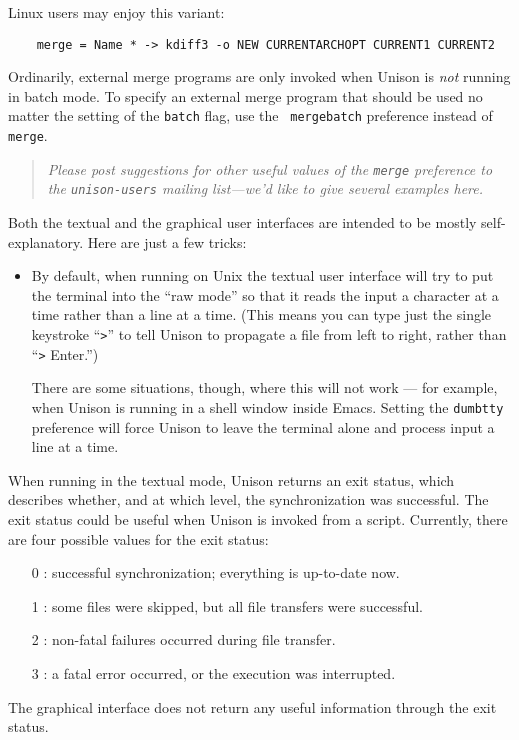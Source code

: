 \documentclass{article}
\begin{document}
Linux users may enjoy this variant:
\begin{verbatim}
    merge = Name * -> kdiff3 -o NEW CURRENTARCHOPT CURRENT1 CURRENT2
\end{verbatim}

Ordinarily, external merge programs are only invoked when Unison is {\em
  not} running in batch mode.  To specify an external merge program that
should be used no matter the setting of the {\tt batch} flag, use the {\tt
  mergebatch} preference instead of {\tt merge}.

\begin{quote}
\it
Please post suggestions for other useful values of the
\verb|merge| preference to the {\tt unison-users} mailing list---we'd like
to give several examples here.
\end{quote}



Both the textual and the graphical user interfaces are intended to be
mostly self-explanatory.  Here are just a few tricks:
\begin{itemize}
\item By default, when running on Unix the textual user interface will
try to put the terminal into the ``raw mode'' so that it reads the input a
character at a time rather than a line at a time.  (This means you can
type just the single keystroke ``\verb|>|'' to tell Unison to
propagate a file from left to right, rather than ``\verb|>| Enter.'')

There are some situations, though, where this will not work --- for
example, when Unison is running in a shell window inside Emacs.
Setting the \verb|dumbtty| preference will force Unison to leave the
terminal alone and process input a line at a time.
\end{itemize}


When running in the textual mode, Unison returns an exit status, which
describes whether, and at which level, the synchronization was successful.
The exit status could be useful when Unison is invoked from a script.
Currently, there are four possible values for the exit status:
\begin{itemize}
\item [0]: successful synchronization; everything is up-to-date now.
\item [1]: some files were skipped, but all file transfers were successful.
\item [2]: non-fatal failures occurred during file transfer.
\item [3]: a fatal error occurred, or the execution was interrupted.
\end{itemize}
The graphical interface does not return any useful information through the
exit status.
\end{document}
